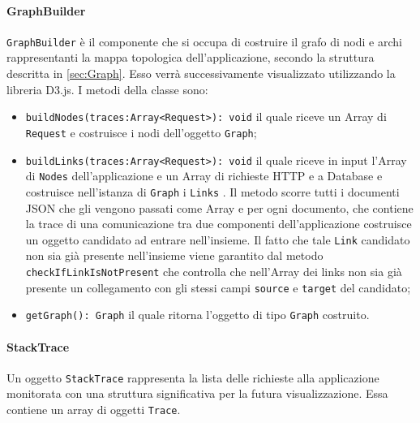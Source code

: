 \paragraph{GraphBuilder} \Spazio
\label{sec:GraphBuilder}
	\texttt{GraphBuilder} è il componente che si occupa di costruire il grafo di nodi e archi rappresentanti la mappa topologica dell'applicazione, secondo la struttura descritta in \ref{sec:Graph}. Esso verrà successivamente visualizzato utilizzando la libreria D3.js. I metodi della classe sono:
	\begin{itemize}
		\item \texttt{buildNodes(traces:Array<Request>): void} il quale riceve un Array di \texttt{Request} e  costruisce i nodi dell'oggetto \texttt{Graph};
				
		\item\texttt{buildLinks(traces:Array<Request>): void} il quale riceve in input l'Array di \texttt{Nodes} dell'applicazione e un Array di richieste HTTP e a Database e costruisce nell'istanza di \texttt{Graph} i \texttt{Links} . Il metodo scorre tutti i documenti JSON che gli vengono passati come Array e per ogni documento, che contiene la trace di una comunicazione tra due componenti dell'applicazione costruisce un oggetto candidato ad entrare nell'insieme. Il fatto che tale \texttt{Link} candidato non sia già presente nell'insieme viene garantito dal metodo \texttt{checkIfLinkIsNotPresent} che controlla che nell'Array dei links non sia già presente un collegamento con gli stessi campi \texttt{source} e \texttt{target} del candidato; 

		\item{\texttt{getGraph(): Graph} il quale ritorna l'oggetto di tipo \texttt{Graph} costruito.  }
	\end{itemize}

\paragraph{StackTrace} \Spazio
Un oggetto \texttt{StackTrace} rappresenta la lista delle richieste alla applicazione monitorata con una struttura significativa per la futura visualizzazione. Essa contiene un array di oggetti \texttt{Trace}.

